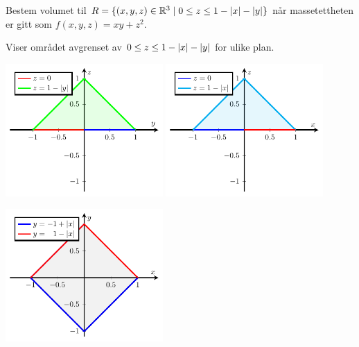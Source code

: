 \begin{frame}
    \begin{oppgave}{}
    Bestem volumet til $R = \{ (x,y,z)\in\mathbb{R}^3 \mid 0 \leq z \leq 1 - \lvert x\rvert - \lvert y\rvert\}$ når
    massetettheten er gitt som $f(x,y,z) = xy + z^2$.
  \end{oppgave}
\end{frame}

\begin{frame}\centerline{Viser området avgrenset av $0 \leq z \leq 1 - \lvert x\rvert - \lvert y\rvert$ for
  ulike plan.}
  \centerline{%
  \includegraphics[width = 0.45\textwidth]{../img/pyramid1}%
  \includegraphics[width = 0.45\textwidth]{../img/pyramid2}}

\centerline{%
  \includegraphics[width = 0.45\textwidth]{../img/pyramid3}%
}
\end{frame}

